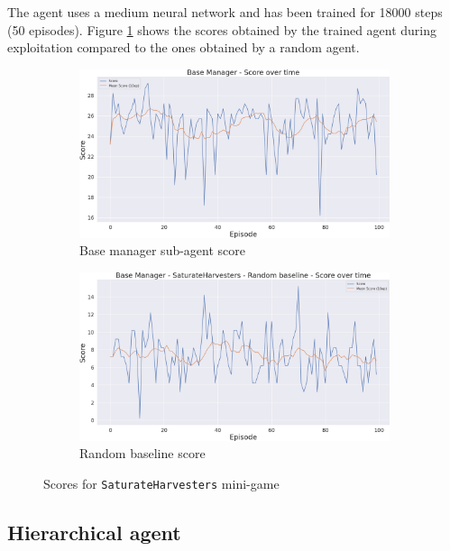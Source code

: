 The agent uses a medium neural network and has been trained for 18000 steps (50 episodes). Figure \ref{fig:SaturateHarvesters_scores} shows the scores obtained by the trained agent during exploitation compared to the ones obtained by a random agent.

\begin{figure}[t]
    \centering
    \begin{subfigure}[b]{0.48\textwidth}
        \includegraphics[width=1\textwidth]{figs/multi_dqn_base_manager/exploit/score.png}
        \caption{Base manager sub-agent score}
    \end{subfigure}
    \hfill
    \begin{subfigure}[b]{0.48\textwidth}
        \includegraphics[width=1\textwidth]{figs/multi_random_base_manager/exploit/score.png}
        \caption{Random baseline score}
    \end{subfigure}
    \caption{Scores for \texttt{SaturateHarvesters} mini-game}
    \label{fig:SaturateHarvesters_scores}
\end{figure}

\subsection{Hierarchical agent}
\label{sec:hierarchical_agent}

